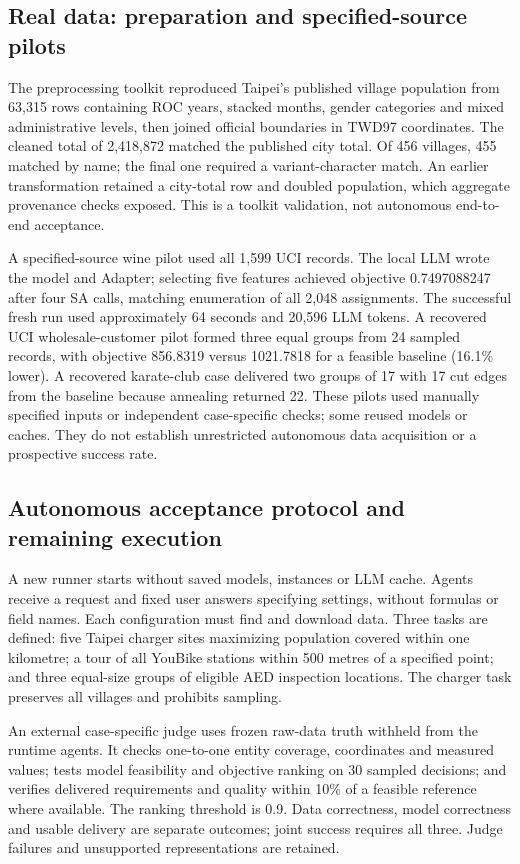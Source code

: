 \subsection{Real data: preparation and specified-source pilots}
The preprocessing toolkit reproduced Taipei's published village population from 63,315 rows containing ROC
years, stacked months, gender categories and mixed administrative levels, then joined official boundaries in
TWD97 coordinates. The cleaned total of 2,418,872 matched the published city total. Of 456 villages, 455 matched
by name; the final one required a variant-character match. An earlier transformation retained a city-total row
and doubled population, which aggregate provenance checks exposed. This is a toolkit validation, not autonomous
end-to-end acceptance.

A specified-source wine pilot used all 1,599 UCI records\cite{uciWine}. The local LLM wrote the model and
Adapter; selecting five features achieved objective 0.7497088247 after four SA calls, matching enumeration of
all 2,048 assignments. The successful fresh run used approximately 64 seconds and 20,596 LLM tokens.
A recovered UCI wholesale-customer pilot\cite{uciWholesale} formed three equal groups from 24 sampled records,
with objective 856.8319 versus 1021.7818 for a feasible baseline (16.1\% lower).
A recovered karate-club case delivered two groups of 17 with 17 cut edges from the baseline because annealing
returned 22. These pilots used manually specified inputs or independent case-specific checks; some reused
models or caches. They do not establish unrestricted autonomous data acquisition or a prospective success rate.

\subsection{Autonomous acceptance protocol and remaining execution}
A new runner starts without saved models, instances or LLM cache. Agents receive a request and fixed user
answers specifying settings, without formulas or field names. Each configuration must find and download data.
Three tasks are defined: five Taipei charger sites maximizing population covered within one kilometre;
a tour of all YouBike stations within 500 metres of a specified point; and three equal-size groups of eligible
AED inspection locations. The charger task preserves all villages and prohibits sampling.

An external case-specific judge uses frozen raw-data truth withheld from the runtime agents. It checks
one-to-one entity coverage, coordinates and measured values; tests model feasibility and objective ranking on
30 sampled decisions; and verifies delivered requirements and quality within 10\% of a feasible reference where
available. The ranking threshold is 0.9. Data correctness, model correctness and usable delivery are separate
outcomes; joint success requires all three. Judge failures and unsupported representations are retained.

